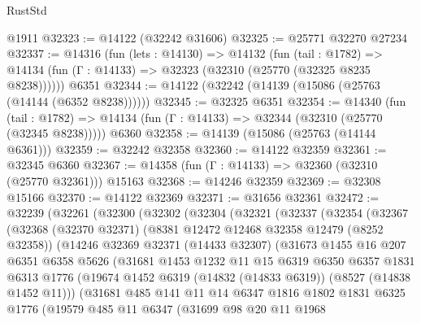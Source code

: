 \begin{lexlean}{RustStd}
\begin{coremodule}
    @1911
@32323 := @14122 (@32242 @31606)
@32325 := @25771 @32270 @27234
@32337 := @14316
    (fun (lets : @14130) =>
    @14132
      (fun (tail : @1782) =>
      @14134 (fun (Γ : @14133) => @32323 (@32310 (@25770 (@32325 @8235 @8238))))))
    @6351
@32344 := @14122 (@32242 (@14139 (@15086 (@25763 (@14144 (@6352 @8238))))))
@32345 := @32325 @6351
@32354 := @14340
    (fun (tail : @1782) => @14134 (fun (Γ : @14133) => @32344 (@32310 (@25770 (@32345 @8238)))))
    @6360
@32358 := @14139 (@15086 (@25763 (@14144 @6361)))
@32359 := @32242 @32358
@32360 := @14122 @32359
@32361 := @32345 @6360
@32367 := @14358 (fun (Γ : @14133) => @32360 (@32310 (@25770 @32361))) @15163
@32368 := @14246 @32359
@32369 := @32308 @15166
@32370 := @14122 @32369
@32371 := @31656 @32361
@32472 := @32239
    (@32261
      (@32300
        (@32302
          (@32304
            (@32321
              (@32337
                (@32354
                  (@32367
                    (@32368
                      (@32370 @32371)
                      (@8381 @12472 @12468 @32358 @12479 (@8252 @32358))
                      (@14246
                        @32369
                        @32371
                        (@14433 @32307)
                        (@31673
                          @1455
                          @16
                          @207
                          @6351
                          @6358
                          @5626
                          (@31681
                            @1453
                            @1232
                            @11
                            @15
                            @6319
                            @6350
                            @6357
                            @1831
                            @6313
                            @1776
                            (@19674 @1452 @6319 (@14832 (@14833 @6319)) (@8527 (@14838 @1452 @11)))
                            (@31681
                              @485
                              @141
                              @11
                              @14
                              @6347
                              @1816
                              @1802
                              @1831
                              @6325
                              @1776
                              (@19579
                                @485
                                @11
                                @6347
                                (@31699
                                  @98
                                  @20
                                  @11
                                  @1968

\end{coremodule}
\end{lexlean}
